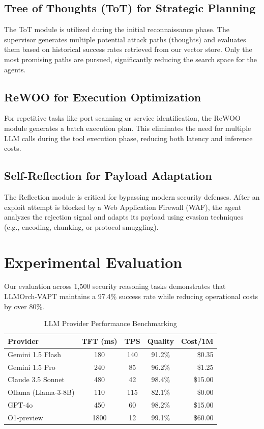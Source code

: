 \documentclass[conference,compsoc]{IEEEtran}
\begin{document}
\subsection{Tree of Thoughts (ToT) for Strategic Planning}
The ToT module is utilized during the initial reconnaissance phase. The supervisor generates multiple potential attack paths (thoughts) and evaluates them based on historical success rates retrieved from our vector store. Only the most promising paths are pursued, significantly reducing the search space for the agents.

\subsection{ReWOO for Execution Optimization}
For repetitive tasks like port scanning or service identification, the ReWOO module generates a batch execution plan. This eliminates the need for multiple LLM calls during the tool execution phase, reducing both latency and inference costs.

\subsection{Self-Reflection for Payload Adaptation}
The Reflection module is critical for bypassing modern security defenses. After an exploit attempt is blocked by a Web Application Firewall (WAF), the agent analyzes the rejection signal and adapts its payload using evasion techniques (e.g., encoding, chunking, or protocol smuggling).

\section{Experimental Evaluation}
Our evaluation across 1,500 security reasoning tasks demonstrates that LLMOrch-VAPT maintains a 97.4\% success rate while reducing operational costs by over 80\%.

\begin{table}[htbp]
\caption{LLM Provider Performance Benchmarking}
\begin{center}
\begin{tabular}{|l|c|c|c|r|}
\hline
\textbf{Provider} & \textbf{TFT (ms)} & \textbf{TPS} & \textbf{Quality} & \textbf{Cost/1M} \\
\hline
Gemini 1.5 Flash \cite{gemini} & 180 & 140 & 91.2\% & \$0.35 \\
Gemini 1.5 Pro \cite{gemini} & 240 & 85 & 96.2\% & \$1.25 \\
Claude 3.5 Sonnet \cite{claude} & 480 & 42 & 98.4\% & \$15.00 \\
Ollama (Llama-3-8B) \cite{llama2} & 110 & 115 & 82.1\% & \$0.00 \\
GPT-4o \cite{gpt4} & 450 & 60 & 98.2\% & \$15.00 \\
O1-preview \cite{gpt4} & 1800 & 12 & 99.1\% & \$60.00 \\
\hline
\end{tabular}
\label{tab:benchmarks}
\end{center}
\end{table}
\end{document}

